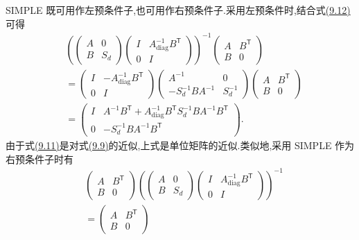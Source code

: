 \begin{example}
SIMPLE 既可用作左预条件子,也可用作右预条件子.采用左预条件时,结合式\hyperref[eq:chapter9-simple-approximate-system]{(9.12)}可得
\[
\begin{aligned}
&\left(
 \begin{pmatrix}A&0\\B&S_d\end{pmatrix}
 \begin{pmatrix}I&A_{\mathrm{diag}}^{-1}B^{\mathsf T}\\0&I\end{pmatrix}
 \right)^{-1}
 \begin{pmatrix}A&B^{\mathsf T}\\B&0\end{pmatrix}\\
&=\begin{pmatrix}I&-A_{\mathrm{diag}}^{-1}B^{\mathsf T}\\0&I\end{pmatrix}
  \begin{pmatrix}A^{-1}&0\\-S_d^{-1}BA^{-1}&S_d^{-1}\end{pmatrix}
  \begin{pmatrix}A&B^{\mathsf T}\\B&0\end{pmatrix}\\
&=\begin{pmatrix}
 I&A^{-1}B^{\mathsf T}+A_{\mathrm{diag}}^{-1}B^{\mathsf T}S_d^{-1}BA^{-1}B^{\mathsf T}\\
 0&-S_d^{-1}BA^{-1}B^{\mathsf T}
 \end{pmatrix}.
\end{aligned}
\]
由于式\hyperref[eq:chapter9-simple-schur]{(9.11)}是对式\hyperref[eq:chapter9-schur-complement]{(9.9)}的近似,上式是单位矩阵的近似.类似地,采用 SIMPLE 作为右预条件子时有
\[
\begin{aligned}
&\begin{pmatrix}A&B^{\mathsf T}\\B&0\end{pmatrix}
 \left(
 \begin{pmatrix}A&0\\B&S_d\end{pmatrix}
 \begin{pmatrix}I&A_{\mathrm{diag}}^{-1}B^{\mathsf T}\\0&I\end{pmatrix}
 \right)^{-1}\\
&=\begin{pmatrix}A&B^{\mathsf T}\\B&0\end{pmatrix}

\end{aligned}\]
\end{example}
